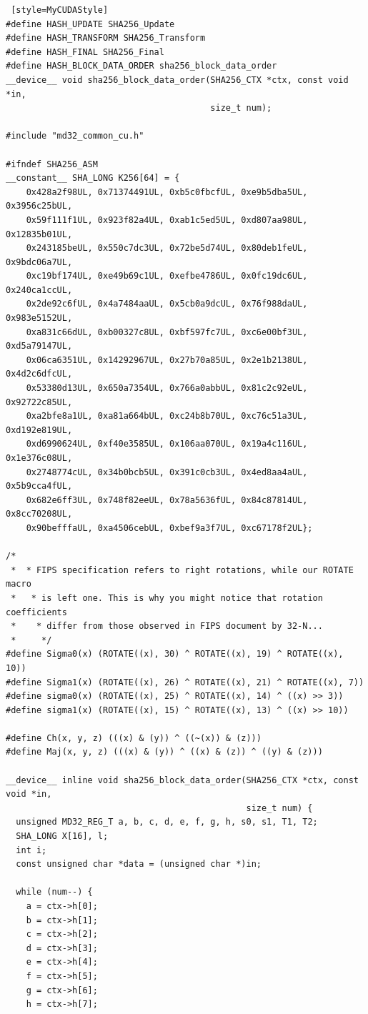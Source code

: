 \documentclass{article}
\begin{document}
\begin{lstlisting} [style=MyCUDAStyle]
#define HASH_UPDATE SHA256_Update
#define HASH_TRANSFORM SHA256_Transform
#define HASH_FINAL SHA256_Final
#define HASH_BLOCK_DATA_ORDER sha256_block_data_order
__device__ void sha256_block_data_order(SHA256_CTX *ctx, const void *in,
                                        size_t num);

#include "md32_common_cu.h"

#ifndef SHA256_ASM
__constant__ SHA_LONG K256[64] = {
    0x428a2f98UL, 0x71374491UL, 0xb5c0fbcfUL, 0xe9b5dba5UL, 0x3956c25bUL,
    0x59f111f1UL, 0x923f82a4UL, 0xab1c5ed5UL, 0xd807aa98UL, 0x12835b01UL,
    0x243185beUL, 0x550c7dc3UL, 0x72be5d74UL, 0x80deb1feUL, 0x9bdc06a7UL,
    0xc19bf174UL, 0xe49b69c1UL, 0xefbe4786UL, 0x0fc19dc6UL, 0x240ca1ccUL,
    0x2de92c6fUL, 0x4a7484aaUL, 0x5cb0a9dcUL, 0x76f988daUL, 0x983e5152UL,
    0xa831c66dUL, 0xb00327c8UL, 0xbf597fc7UL, 0xc6e00bf3UL, 0xd5a79147UL,
    0x06ca6351UL, 0x14292967UL, 0x27b70a85UL, 0x2e1b2138UL, 0x4d2c6dfcUL,
    0x53380d13UL, 0x650a7354UL, 0x766a0abbUL, 0x81c2c92eUL, 0x92722c85UL,
    0xa2bfe8a1UL, 0xa81a664bUL, 0xc24b8b70UL, 0xc76c51a3UL, 0xd192e819UL,
    0xd6990624UL, 0xf40e3585UL, 0x106aa070UL, 0x19a4c116UL, 0x1e376c08UL,
    0x2748774cUL, 0x34b0bcb5UL, 0x391c0cb3UL, 0x4ed8aa4aUL, 0x5b9cca4fUL,
    0x682e6ff3UL, 0x748f82eeUL, 0x78a5636fUL, 0x84c87814UL, 0x8cc70208UL,
    0x90befffaUL, 0xa4506cebUL, 0xbef9a3f7UL, 0xc67178f2UL};

/*
 *  * FIPS specification refers to right rotations, while our ROTATE macro
 *   * is left one. This is why you might notice that rotation coefficients
 *    * differ from those observed in FIPS document by 32-N...
 *     */
#define Sigma0(x) (ROTATE((x), 30) ^ ROTATE((x), 19) ^ ROTATE((x), 10))
#define Sigma1(x) (ROTATE((x), 26) ^ ROTATE((x), 21) ^ ROTATE((x), 7))
#define sigma0(x) (ROTATE((x), 25) ^ ROTATE((x), 14) ^ ((x) >> 3))
#define sigma1(x) (ROTATE((x), 15) ^ ROTATE((x), 13) ^ ((x) >> 10))

#define Ch(x, y, z) (((x) & (y)) ^ ((~(x)) & (z)))
#define Maj(x, y, z) (((x) & (y)) ^ ((x) & (z)) ^ ((y) & (z)))

__device__ inline void sha256_block_data_order(SHA256_CTX *ctx, const void *in,
                                               size_t num) {
  unsigned MD32_REG_T a, b, c, d, e, f, g, h, s0, s1, T1, T2;
  SHA_LONG X[16], l;
  int i;
  const unsigned char *data = (unsigned char *)in;

  while (num--) {
    a = ctx->h[0];
    b = ctx->h[1];
    c = ctx->h[2];
    d = ctx->h[3];
    e = ctx->h[4];
    f = ctx->h[5];
    g = ctx->h[6];
    h = ctx->h[7];


\end{lstlisting}
\end{document}
